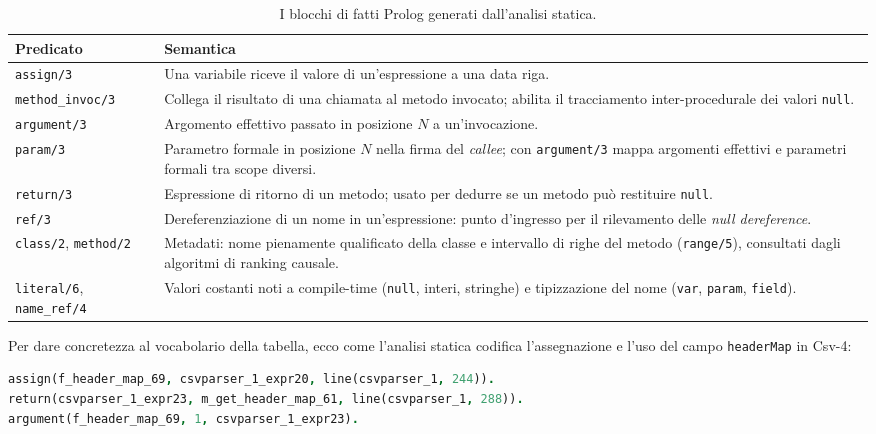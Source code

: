 \begin{table}[H]
\centering
\small
\caption{I blocchi di fatti Prolog generati dall'analisi statica.}
\label{tab:fatti_prolog}
\begin{tabularx}{\textwidth}{@{}l >{\raggedright\arraybackslash}X@{}}
\toprule
\textbf{Predicato} & \textbf{Semantica} \\
\midrule
\texttt{assign/3} & Una variabile riceve il valore di un'espressione a una data riga. \\
\texttt{method\_invoc/3} & Collega il risultato di una chiamata al metodo invocato; abilita il tracciamento inter-procedurale dei valori \texttt{null}. \\
\texttt{argument/3} & Argomento effettivo passato in posizione $N$ a un'invocazione. \\
\texttt{param/3} & Parametro formale in posizione $N$ nella firma del \textit{callee}; con \texttt{argument/3} mappa argomenti effettivi e parametri formali tra scope diversi. \\
\texttt{return/3} & Espressione di ritorno di un metodo; usato per dedurre se un metodo può restituire \texttt{null}. \\
\texttt{ref/3} & Dereferenziazione di un nome in un'espressione: punto d'ingresso per il rilevamento delle \textit{null dereference}. \\
\texttt{class/2}, \texttt{method/2} & Metadati: nome pienamente qualificato della classe e intervallo di righe del metodo (\texttt{range/5}), consultati dagli algoritmi di ranking causale. \\
\texttt{literal/6}, \texttt{name\_ref/4} & Valori costanti noti a compile-time (\texttt{null}, interi, stringhe) e tipizzazione del nome (\texttt{var}, \texttt{param}, \texttt{field}). \\
\bottomrule
\end{tabularx}
\end{table}

Per dare concretezza al vocabolario della tabella, ecco come l'analisi statica codifica l'assegnazione e l'uso
del campo \texttt{headerMap} in Csv-4:

\begin{lstlisting}[language=Prolog]
assign(f_header_map_69, csvparser_1_expr20, line(csvparser_1, 244)).
return(csvparser_1_expr23, m_get_header_map_61, line(csvparser_1, 288)).
argument(f_header_map_69, 1, csvparser_1_expr23).
\end{lstlisting}

